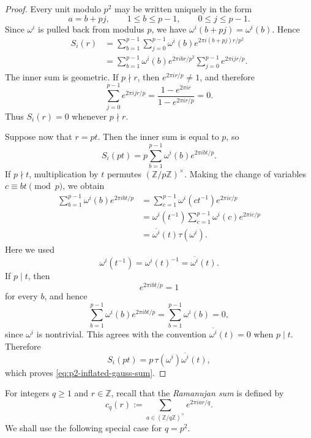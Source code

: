 \documentclass[11pt,table]{amsart}
\newcommand{\Z}{\mathbb{Z}}
\numberwithin{equation}{section}
\begin{document}
\begin{proof}
Every unit modulo \(p^2\) may be written uniquely in the form
\[
        a=b+pj,
        \qquad
        1\leq b\leq p-1,\qquad
        0\leq j\leq p-1.
\]
Since \(\omega^i\) is pulled back from modulus \(p\), we have
\(\omega^i(b+pj)=\omega^i(b)\). Hence
\[
\begin{aligned}
        S_i(r)
        &=
        \sum_{b=1}^{p-1}
        \sum_{j=0}^{p-1}
        \omega^i(b)
        e^{2\pi i(b+pj)r/p^2}                                    \\
        &=
        \sum_{b=1}^{p-1}
        \omega^i(b)e^{2\pi i br/p^2}
        \sum_{j=0}^{p-1}e^{2\pi i jr/p}.
\end{aligned}
\]
The inner sum is geometric. If \(p\nmid r\), then
\(e^{2\pi i r/p}\neq1\), and therefore
\[
        \sum_{j=0}^{p-1}e^{2\pi i jr/p}
        =
        \frac{1-e^{2\pi i r}}{1-e^{2\pi i r/p}}
        =
        0.
\]
Thus \(S_i(r)=0\) whenever \(p\nmid r\).
\par Suppose now that \(r=pt\). Then the inner sum is equal to \(p\), so
\[
        S_i(pt)
        =
        p\sum_{b=1}^{p-1}
        \omega^i(b)e^{2\pi i bt/p}.
\]
If \(p\nmid t\), multiplication by \(t\) permutes
\((\Z/p\Z)^\times\). Making the change of variables
\(c\equiv bt\pmod p\), we obtain
\[
\begin{aligned}
        \sum_{b=1}^{p-1}
        \omega^i(b)e^{2\pi i bt/p}
        &=
        \sum_{c=1}^{p-1}
        \omega^i(ct^{-1})e^{2\pi i c/p}                         \\
        &=
        \omega^i(t^{-1})
        \sum_{c=1}^{p-1}\omega^i(c)e^{2\pi i c/p}                \\
        &=
        \overline{\omega^i}(t)\tau(\omega^i).
\end{aligned}
\]
Here we used
\[
        \omega^i(t^{-1})
        =
        \omega^i(t)^{-1}
        =
        \overline{\omega^i}(t).
\]
If \(p\mid t\), then
\[
        e^{2\pi i bt/p}=1
\]
for every \(b\), and hence
\[
        \sum_{b=1}^{p-1}
        \omega^i(b)e^{2\pi i bt/p}
        =
        \sum_{b=1}^{p-1}\omega^i(b)
        =
        0,
\]
since \(\omega^i\) is nontrivial. This agrees with the convention
\(\overline{\omega^i}(t)=0\) when \(p\mid t\). Therefore
\[
        S_i(pt)
        =
        p\,\tau(\omega^i)\overline{\omega^i}(t),
\]
which proves \eqref{eq:p2-inflated-gauss-sum}.
\end{proof}

For integers \(q\geq1\) and \(r\in\Z\), recall that the
\emph{Ramanujan sum} is defined by
\begin{equation}\label{ramsum}c_q(r)
        :=
        \sum_{a\in(\Z/q\Z)^\times}
        e^{2\pi i ar/q}.
\end{equation}
We shall use the following special case for \(q=p^2\).
\end{document}
